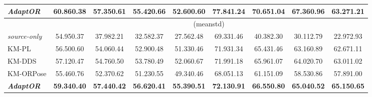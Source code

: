 \begin{table*}[t]
{\begin{tabular}{l|cccc|cccc}
			\emph{\textbf{AdaptOR}}  & 60.860.38                                                                                        & \textbf{57.350.61}                                         & \textbf{55.420.66} & \textbf{52.600.60} & 77.841.24          & \textbf{70.651.04} & \textbf{67.360.96} & \textbf{63.271.21} \Tstrut \\
			\hline
			                         & \multicolumn{8}{c}{ (meanstd)} \Tstrut \Bstrut                                                                                                                                                                                                                                       \\
			\hline
			\emph{source-only}       & 54.950.37                                                                                        & 37.982.21                                                  & 32.582.37          & 27.562.48          & 69.331.46          & 40.382.30          & 30.112.79          & 22.972.93  \Tstrut         \\\hline
			KM-PL                    & 56.500.60                                                                                        & 54.060.44                                                  & 52.900.48          & 51.330.46          & 71.931.34          & 65.431.46          & 63.160.89          & 62.671.11 \Tstrut          \\
			KM-DDS                   & 57.120.47                                                                                        & 54.760.50                                                  & 53.780.49          & 52.060.67          & 71.991.18          & 65.961.07          & 64.020.70          & 63.011.02 \Tstrut          \\
			KM-ORPose                & 55.460.76                                                                                        & 52.370.62                                                  & 51.230.55          & 49.340.46          & 68.051.13          & 61.151.09          & 58.530.86          & 57.891.00 \Tstrut          \\\hline
			\emph{\textbf{AdaptOR}}  & \textbf{59.340.40}                                                                               & \textbf{57.440.42}                                         & \textbf{56.620.41} & \textbf{55.390.51} & \textbf{72.130.91} & \textbf{66.550.80} & \textbf{65.040.52} & \textbf{65.150.65} \Tstrut \\
			\hline
			\bottomrule
		\end{tabular}
	}
	\label{table:source-target-da}
	\vspace{-1mm}
\end{table*}

